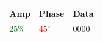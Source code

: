 \documentclass[]{beamer}
\begin{document}
\begin{frame}
\begin{columns}[T]
\begin{column}[T]{5cm}
        \end{column}
        \begin{column}[T]{5cm}
            \begin{table}[]
                \begin{tabular}{lll}
                    Amp  & Phase & Data \\
                    \hline
                    \textcolor{green}{25\%} & \textcolor{red}{$45^{\circ}$} & \textcolor{cyan!50}{0000} \\
                \end{tabular}
            \end{table}
        \end{column}
    \end{columns}
\end{frame}
\end{document}

